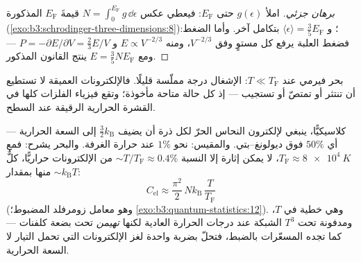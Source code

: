 \begin{proof}[برهان جزئي]
املأ $g(\epsilon)$ حتى $E_{\text{F}}$: فيعطي عكس $N = \int_0^{
E_{\text{F}}}g\,\dd\epsilon$ قيمةَ $E_{\text{F}}$ المذكورة
(\cref{exo:b3:schrodinger-three-dimensions:8})؛ و $\langle\epsilon
\rangle = \tfrac35 E_{\text{F}}$ بتكامل آخر. وأما الضغط:
فضغط العلبة يرفع كل مستوٍ وفق $V^{-2/3}$، ومنه $E
\propto V^{-2/3}$ و $P = -\partial E/\partial V = \tfrac23 E/V$
--- ومع $E = \tfrac35 NE_{\text{F}}$ ينتج القانون المذكور.
\end{proof}

\begin{omfigure}

{\small بحر فيرمي عند $T \ll T_{\text{F}}$: الإشغال درجة
مملّسة قليلًا. فالإلكترونات العميقة لا تستطيع أن تنتثر أو تمتصّ أو
تستجيب --- إذ كل حالة متاحة مأخوذة؛ وتقع فيزياء الفلزات
كلها في القشرة الحرارية الرقيقة عند السطح.}
\end{omfigure}

\begin{example}\label{ex:b3:quantum-statistics:heat}
كلاسيكيًّا، ينبغي لإلكترون النحاس الحرّ لكل ذرة أن يضيف $\tfrac32
k_{\text{B}}$ إلى السعة الحرارية --- أي $50\%$ فوق
ديولونغ--بتي. والمقيس: نحو $1\%$ عند حرارة الغرفة. والبحر
يشرح: فمع $T_{\text{F}} \approx \qty{8e4}{K}$، لا يمكن إثارة
إلا النسبة $\sim T/T_{\text{F}} \approx 0.4\%$ من الإلكترونات
حراريًّا، كلٌّ منها بمقدار $\sim k_{\text{B}}T$:
\[
C_{\text{el}} \approx \frac{\pi^2}{2}\,
Nk_{\text{B}}\,\frac{T}{T_{\text{F}}}
\]
(وهو معامل زومرفلد المضبوط؛
\cref{exo:b3:quantum-statistics:12}). وهي خطية في $T$، ومدفونة
تحت $T^3$ الشبكة عند درجات الحرارة العادية لكنها
\emph{تهيمن} تحت بضعة كلفنات --- كما تجده المسعّرات
بالضبط، فتحلّ بضربة واحدة لغز الإلكترونات التي
تحمل التيار لا السعة الحرارية.
\end{example}

